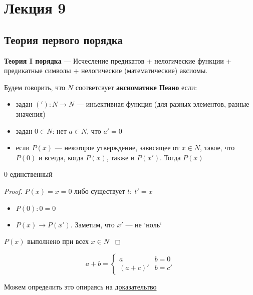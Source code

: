 \documentclass[oneside]{book}
\renewcommand{\leftmark}{}
\begin{document}
\chapter*{Лекция 9}\renewcommand{\leftmark}{Лекция 9}
\label{sec:orgdf724f2}
\section{Теория первого порядка}
\label{sec:orgcee1127}
\begin{definition}
	\textbf{Теория I порядка} --- Исчесление предикатов + нелогические функции + предикатные символы + нелогические (математические) аксиомы.
	\label{org6670dfc}
\end{definition}
\begin{definition}
	Будем говорить, что \(N\) соответсвует \textbf{аксиоматике Пеано} если:
	\begin{itemize}
		\item задан \(('): N \to N\) --- инъективная функция (для разных элементов, разные значения)
		\item задан \(0 \in N\): нет \(a \in N\), что \(a' = 0\)
		\item если \(P(x)\) --- некоторое утверждение, зависящее от \(x \in N\), такое, что \(P(0)\) и всегда, когда \(P(x)\), также и \(P(x')\). Тогда \(P(x)\)
	\end{itemize}
	\label{orgbe8950b}
\end{definition}
\beginproperty
\begin{property}
	\(0\) единственный
	\label{orgab9f1b2}
\end{property}
\begin{proof}
	\(P(x)=x = 0\) либо существует \(t:\ t' = x\)
	\begin{itemize}
		\item \(P(0): 0 = 0\)
		\item \(P(x) \to P(x')\). Заметим, что \(x'\) --- не `ноль`
	\end{itemize}
	\(P(x)\) выполнено при всех \(x \in N\)
	\label{org3444f5a}
\end{proof}
\begin{definition}
	\[ a + b = \begin{cases}
			a        & b = 0  \\
			(a + c)' & b = c'
		\end{cases}\]
	\label{org0aa68e9}
\end{definition}
Можем определить это опираясь на \hyperref[org3444f5a]{доказательтво}
\end{document}
